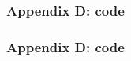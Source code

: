 \documentclass{beamer}
\theoremstyle{definition} \newtheorem{de}{Def}
\theoremstyle{remark} \newtheorem{os}[de]{Remark}
\theoremstyle{plain} \newtheorem{te}[de]{Teo}
\theoremstyle{plain} \newtheorem{co}[de]{Cor}
\theoremstyle{plain} \newtheorem{pr}[de]{Prop}
\theoremstyle{plain} \newtheorem{lem}[de]{Lemm}
\theoremstyle{remark} \newtheorem{rem}[de]{Remark}
\begin{document}
\begin{frame}[label=CodeIf]
  \frametitle{Appendix D: code}

\end{frame}


\begin{frame}
  \frametitle{Appendix D: code}

  \hyperlink{BeforeCodeIf}{}
\end{frame}


\begin{frame}
  
  
\end{frame}




\end{document}
